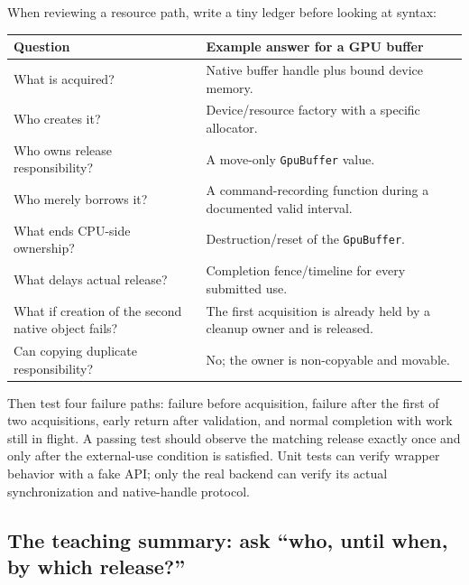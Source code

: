 \hypertarget{05-engine-i-ch004-a-compact-laboratory-choose-the-owner-before-the-pointer}{}

When reviewing a resource path, write a tiny ledger before looking at syntax:

{\def\LTcaptype{none} %
\begin{longtable}[]{@{}
  >{\raggedright\arraybackslash}p{}
  >{\raggedright\arraybackslash}p{}@{}}
\toprule\noalign{}
\begin{minipage}[b]{\linewidth}\raggedright
Question
\end{minipage} & \begin{minipage}[b]{\linewidth}\raggedright
Example answer for a GPU buffer
\end{minipage} \\
\midrule\noalign{}
\endhead
\bottomrule\noalign{}
\endlastfoot
What is acquired? & Native buffer handle plus bound device memory. \\
Who creates it? & Device/resource factory with a specific allocator. \\
Who owns release responsibility? & A move-only \texttt{GpuBuffer} value. \\
Who merely borrows it? & A command-recording function during a documented valid interval. \\
What ends CPU-side ownership? & Destruction/reset of the \texttt{GpuBuffer}. \\
What delays actual release? & Completion fence/timeline for every submitted use. \\
What if creation of the second native object fails? & The first acquisition is already held by a cleanup owner and is released. \\
Can copying duplicate responsibility? & No; the owner is non-copyable and movable. \\
\end{longtable}
}

Then test four failure paths: failure before acquisition, failure after the first of two acquisitions, early return after validation, and normal completion with work still in flight. A passing test should observe the matching release exactly once and only after the external-use condition is satisfied. Unit tests can verify wrapper behavior with a fake API; only the real backend can verify its actual synchronization and native-handle protocol.

\subsection{The teaching summary: ask ``who, until when, by which release?''}\label{05-engine-i-ch004-the-teaching-summary-ask-who-until-when-by-which-release}

